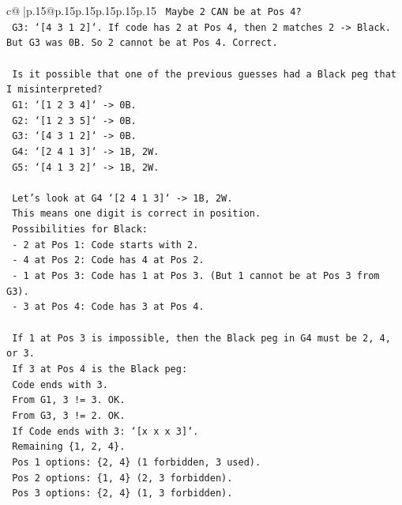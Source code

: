 \documentclass{article}
\begin{document}
{\begin{supertabular}{c@{$\;$}|p{.15\linewidth}@{}p{.15\linewidth}p{.15\linewidth}p{.15\linewidth}p{.15\linewidth}p{.15\linewidth}}
{{{\texttt{    Maybe 2 CAN be at Pos 4?} \\
\texttt{    G3: `{[}4 3 1 2{]}`. If code has 2 at Pos 4, then 2 matches 2 {-}> Black. But G3 was 0B. So 2 cannot be at Pos 4. Correct.} \\
\\ 
\texttt{    Is it possible that one of the previous guesses had a Black peg that I misinterpreted?} \\
\texttt{    G1: `{[}1 2 3 4{]}` {-}> 0B.} \\
\texttt{    G2: `{[}1 2 3 5{]}` {-}> 0B.} \\
\texttt{    G3: `{[}4 3 1 2{]}` {-}> 0B.} \\
\texttt{    G4: `{[}2 4 1 3{]}` {-}> 1B, 2W.} \\
\texttt{    G5: `{[}4 1 3 2{]}` {-}> 1B, 2W.} \\
\\ 
\texttt{    Let's look at G4 `{[}2 4 1 3{]}` {-}> 1B, 2W.} \\
\texttt{    This means one digit is correct in position.} \\
\texttt{    Possibilities for Black:} \\
\texttt{    {-} 2 at Pos 1: Code starts with 2.} \\
\texttt{    {-} 4 at Pos 2: Code has 4 at Pos 2.} \\
\texttt{    {-} 1 at Pos 3: Code has 1 at Pos 3. (But 1 cannot be at Pos 3 from G3).} \\
\texttt{    {-} 3 at Pos 4: Code has 3 at Pos 4.} \\
\\ 
\texttt{    If 1 at Pos 3 is impossible, then the Black peg in G4 must be 2, 4, or 3.} \\
\texttt{    If 3 at Pos 4 is the Black peg:} \\
\texttt{    Code ends with 3.} \\
\texttt{    From G1, 3 != 3. OK.} \\
\texttt{    From G3, 3 != 2. OK.} \\
\texttt{    If Code ends with 3: `{[}x x x 3{]}`.} \\
\texttt{    Remaining \{1, 2, 4\}.} \\
\texttt{    Pos 1 options: \{2, 4\} (1 forbidden, 3 used).} \\
\texttt{    Pos 2 options: \{1, 4\} (2, 3 forbidden).} \\
\texttt{    Pos 3 options: \{2, 4\} (1, 3 forbidden).} \\
\\ 
}}}
\end{supertabular}}
\end{document}
